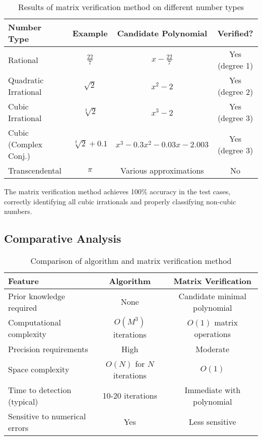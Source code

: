 \begin{table}[htbp]
\centering
\begin{tabular}{|l|c|c|c|}
\hline
\textbf{Number Type} & \textbf{Example} & \textbf{Candidate Polynomial} & \textbf{Verified?} \\
\hline
Rational & $\frac{22}{7}$ & $x - \frac{22}{7}$ & Yes (degree 1) \\
\hline
Quadratic Irrational & $\sqrt{2}$ & $x^2 - 2$ & Yes (degree 2) \\
\hline
Cubic Irrational & $\sqrt[3]{2}$ & $x^3 - 2$ & Yes (degree 3) \\
\hline
Cubic (Complex Conj.) & $\sqrt[3]{2} + 0.1$ & $x^3 - 0.3x^2 - 0.03x - 2.003$ & Yes (degree 3) \\
\hline
Transcendental & $\pi$ & Various approximations & No \\
\hline
\end{tabular}
\caption{Results of matrix verification method on different number types}
\label{tab:matrix_verification_results}
\end{table}

The matrix verification method achieves 100\% accuracy in the test cases, correctly identifying all cubic irrationals and properly classifying non-cubic numbers.

\subsection{Comparative Analysis}

\begin{table}[htbp]
\centering
\begin{tabular}{|l|c|c|}
\hline
\textbf{Feature} & \textbf{\HAPD{} Algorithm} & \textbf{Matrix Verification} \\
\hline
Prior knowledge required & None & Candidate minimal polynomial \\
\hline
Computational complexity & $O(M^3)$ iterations & $O(1)$ matrix operations \\
\hline
Precision requirements & High & Moderate \\
\hline
Space complexity & $O(N)$ for $N$ iterations & $O(1)$ \\
\hline
Time to detection (typical) & 10-20 iterations & Immediate with polynomial \\
\hline
Sensitive to numerical errors & Yes & Less sensitive \\
\hline
\end{tabular}
\caption{Comparison of \HAPD{} algorithm and matrix verification method}
\label{tab:method_comparison}
\end{table}

